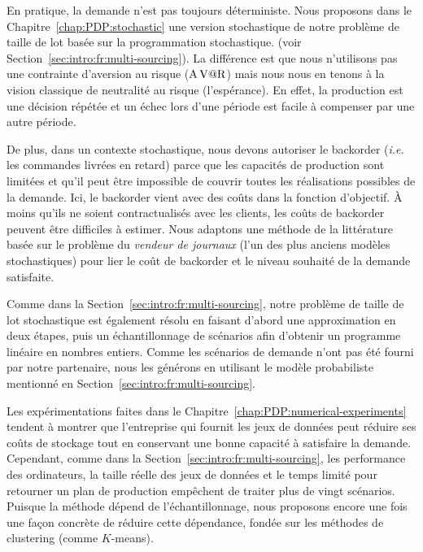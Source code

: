 \medskip


En pratique, la demande n'est pas toujours déterministe.
Nous proposons dans le Chapitre~\ref{chap:PDP:stochastic} une version stochastique de notre problème de taille de lot basée sur la programmation stochastique. (voir Section~\ref{sec:intro:fr:multi-sourcing}).
La différence est que nous n'utilisons pas une contrainte d'aversion au risque ($\operatorname{A\operatorname{V@R}}$) mais nous nous en tenons à la vision classique de neutralité au risque (l'espérance).
En effet, la production est une décision répétée et un échec lors d'une période est facile à compenser par une autre période.


De plus, dans un contexte stochastique, nous devons autoriser le backorder (\emph{i.e.} les commandes livrées en retard) parce que les capacités de production sont limitées et qu'il peut être impossible de couvrir toutes les réalisations possibles de la demande.
Ici, le backorder vient avec des coûts dans la fonction d'objectif.
\`A moins qu'ils ne soient contractualisés avec les clients, les coûts de backorder peuvent être difficiles à estimer.
Nous adaptons une méthode de la littérature basée sur le problème du \emph{vendeur de journaux} (l'un des plus anciens modèles stochastiques) pour lier le coût de backorder et le niveau souhaité de la demande satisfaite.


Comme dans la Section~\ref{sec:intro:fr:multi-sourcing}, notre problème de taille de lot stochastique est également résolu en faisant d'abord une approximation en deux étapes, puis un échantillonnage de scénarios afin d'obtenir un programme linéaire en nombres entiers.
Comme les scénarios de demande n'ont pas été fourni par notre partenaire, nous les générons en utilisant le modèle probabiliste mentionné en Section~\ref{sec:intro:fr:multi-sourcing}.


\medskip


Les expérimentations faites dans le Chapitre~\ref{chap:PDP:numerical-experiments} tendent à montrer que l'entreprise qui fournit les jeux de données peut réduire ses coûts de stockage tout en conservant une bonne capacité à satisfaire la demande.
Cependant, comme dans la Section~\ref{sec:intro:fr:multi-sourcing}, les performance des ordinateurs, la taille réelle des jeux de données et le temps limité pour retourner un plan de production empêchent de traiter plus de vingt scénarios.
Puisque la méthode dépend de l'échantillonnage, nous proposons encore une fois une façon concrète de réduire cette dépendance, fondée sur les méthodes de clustering (comme $K$-means).


